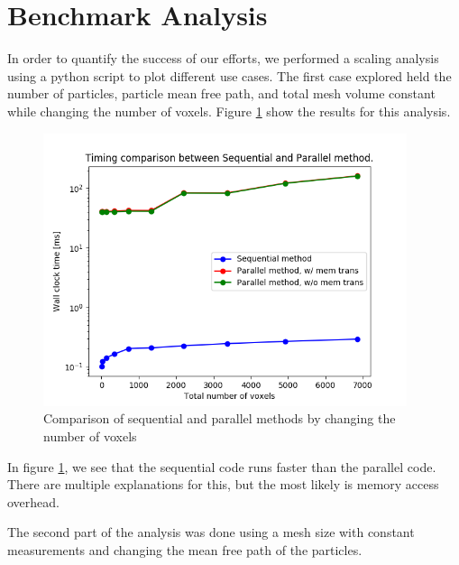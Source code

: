 \section{Benchmark Analysis}
In order to quantify the success of our efforts, we performed a scaling analysis 
using a python script to plot different use cases.   
The first case explored held the number of particles, 
particle mean free path, and total mesh volume constant while changing 
the number of voxels. Figure \ref{compare1} show the results for this analysis. 

\begin{figure}[]
 \begin{centering}
 \centering
 \includegraphics[width=0.6\linewidth,height=8cm]{../figs/compare.png}
 \caption{Comparison of sequential and parallel methods by changing the number of voxels}
 \label{compare1}
 \end{centering}
\end{figure}

In figure \ref{compare1}, we see that the sequential code runs faster than the 
parallel code. There are multiple explanations for this, but the most likely is 
memory access overhead.

The second part of the analysis was done using a mesh size with constant measurements 
and changing the mean free path of the particles. 

